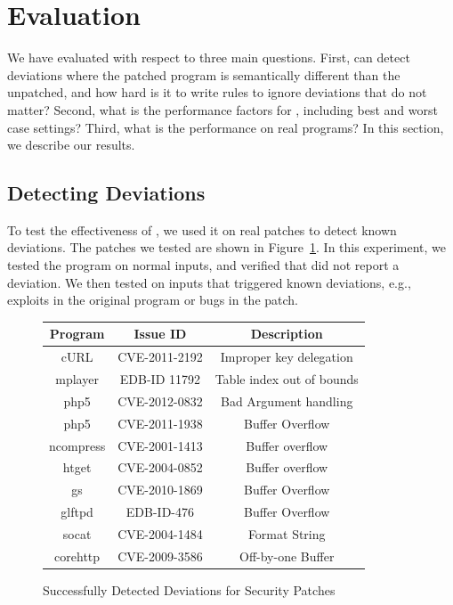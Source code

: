 \section{Evaluation}
\label{tach:sec:eval}

We have evaluated \tachyon with respect to three main
questions. First, can \tachyon detect deviations where the patched
program is semantically different than the unpatched, and how hard is
it to write rules to ignore deviations that do not matter? Second,
what is the performance factors for \tachyon, including best and worst
case settings? Third, what is the performance on real programs?  In
this section, we describe our results.

\subsection{Detecting Deviations}

To test the effectiveness of \tachyon, we used it on real patches
to detect known deviations.  The patches we tested are shown in
Figure~\ref{tach:fig:bug}. In this experiment, we tested the program on
normal inputs, and verified that \tachyon did not report a
deviation. We then tested on inputs that triggered known deviations,
e.g., exploits in the original program or bugs in the patch.

\begin{figure}
\begin{footnotesize}
\begin{tabular}{|c|c|c|}
\hline
Program & Issue ID & Description\\
\hline \hline
cURL & CVE-2011-2192 & Improper key delegation\\
\hline
mplayer & EDB-ID 11792 & Table index out of bounds \\
\hline
php5 & CVE-2012-0832 & Bad Argument handling \\
\hline
php5 & CVE-2011-1938 & Buffer Overflow\\
\hline
ncompress & CVE-2001-1413 & Buffer overflow \\
\hline
htget & CVE-2004-0852 & Buffer overflow \\
\hline
gs & CVE-2010-1869 & Buffer Overflow\\
\hline
glftpd & EDB-ID-476 & Buffer Overflow\\
\hline
socat & CVE-2004-1484 & Format String\\
\hline
corehttp & CVE-2009-3586 & Off-by-one Buffer\\
\hline


\end{tabular}
\end{footnotesize}
\caption{Successfully Detected Deviations for Security Patches}
\label{tach:fig:bug}
\end{figure}


